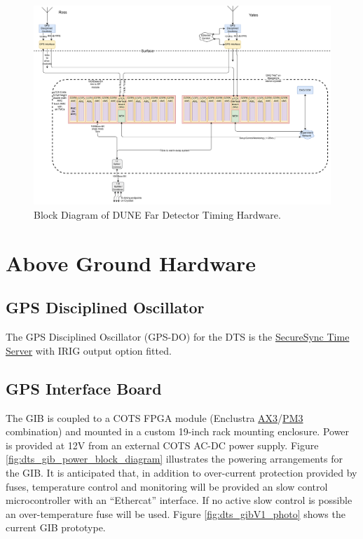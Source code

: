 \documentclass[fleqn,12pt,a4paper]{olplainarticle}
\begin{document}
\begin{figure}[ht]
\centering
\includegraphics[width=\linewidth]{dune_timing_system_block_diagram_twepp22_1sept22_02.drawio.pdf}
\caption{Block Diagram of DUNE Far Detector Timing Hardware.}
\label{fig:dts_fd_block_diagram}
\end{figure}

\section{Above Ground Hardware}

\subsection{GPS Disciplined Oscillator}

The GPS Disciplined Oscillator (GPS-DO) for the DTS is the \href{https://safran-navigation-timing.com/product/securesync-time-and-frequency-reference-system}{SecureSync Time Server} with IRIG output option fitted.

\subsection{GPS Interface Board}

The GIB is coupled to a COTS FPGA module (Enclustra \href{https://www.enclustra.com/en/products/fpga-modules/mars-ax3/}{AX3}/\href{https://www.enclustra.com/en/products/base-boards/mars-pm3/}{PM3} combination) and mounted in a custom 19-inch rack mounting enclosure. Power is provided at 12V from an external COTS AC-DC power supply. Figure \ref{fig:dts_gib_power_block_diagram} illustrates the powering arrangements for the GIB. It is anticipated that, in addition to over-current protection provided by fuses, temperature control and monitoring will be provided an slow control microcontroller with an  ``Ethercat'' interface. If no active slow control is possible an over-temperature fuse will be used. Figure \ref{fig:dts_gibV1_photo} shows the current GIB prototype.
\end{document}
